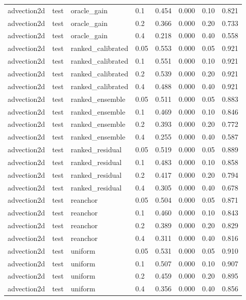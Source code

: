 \begin{tabular}{llllrrrr}
advection2d & test & oracle\_gain & 0.1 & 0.454 & 0.000 & 0.10 & 0.821 \\
advection2d & test & oracle\_gain & 0.2 & 0.366 & 0.000 & 0.20 & 0.733 \\
advection2d & test & oracle\_gain & 0.4 & 0.218 & 0.000 & 0.40 & 0.558 \\
advection2d & test & ranked\_calibrated & 0.05 & 0.553 & 0.000 & 0.05 & 0.921 \\
advection2d & test & ranked\_calibrated & 0.1 & 0.551 & 0.000 & 0.10 & 0.921 \\
advection2d & test & ranked\_calibrated & 0.2 & 0.539 & 0.000 & 0.20 & 0.921 \\
advection2d & test & ranked\_calibrated & 0.4 & 0.488 & 0.000 & 0.40 & 0.921 \\
advection2d & test & ranked\_ensemble & 0.05 & 0.511 & 0.000 & 0.05 & 0.883 \\
advection2d & test & ranked\_ensemble & 0.1 & 0.469 & 0.000 & 0.10 & 0.846 \\
advection2d & test & ranked\_ensemble & 0.2 & 0.393 & 0.000 & 0.20 & 0.772 \\
advection2d & test & ranked\_ensemble & 0.4 & 0.255 & 0.000 & 0.40 & 0.587 \\
advection2d & test & ranked\_residual & 0.05 & 0.519 & 0.000 & 0.05 & 0.889 \\
advection2d & test & ranked\_residual & 0.1 & 0.483 & 0.000 & 0.10 & 0.858 \\
advection2d & test & ranked\_residual & 0.2 & 0.417 & 0.000 & 0.20 & 0.794 \\
advection2d & test & ranked\_residual & 0.4 & 0.305 & 0.000 & 0.40 & 0.678 \\
advection2d & test & reanchor & 0.05 & 0.504 & 0.000 & 0.05 & 0.871 \\
advection2d & test & reanchor & 0.1 & 0.460 & 0.000 & 0.10 & 0.843 \\
advection2d & test & reanchor & 0.2 & 0.389 & 0.000 & 0.20 & 0.829 \\
advection2d & test & reanchor & 0.4 & 0.311 & 0.000 & 0.40 & 0.816 \\
advection2d & test & uniform & 0.05 & 0.531 & 0.000 & 0.05 & 0.910 \\
advection2d & test & uniform & 0.1 & 0.507 & 0.000 & 0.10 & 0.907 \\
advection2d & test & uniform & 0.2 & 0.459 & 0.000 & 0.20 & 0.895 \\
advection2d & test & uniform & 0.4 & 0.356 & 0.000 & 0.40 & 0.856 \\

\end{tabular}
